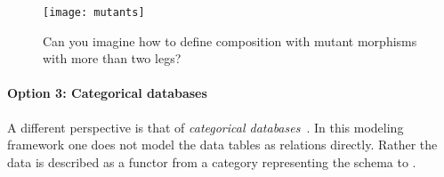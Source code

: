 \begin{figure}[h]
    \centering
    \texttt{[image: mutants]}
    \caption{Can you imagine how to define
    composition with mutant morphisms
    with more than two legs?}
\end{figure}

\paragraph{Option 3: Categorical databases}

A different perspective is that of \emph{categorical databases}~\cite{spivak2019categorical}. In this modeling framework
one does not model the data tables as relations directly.
Rather the data is described as a functor
from a category representing the schema
to \Set.
